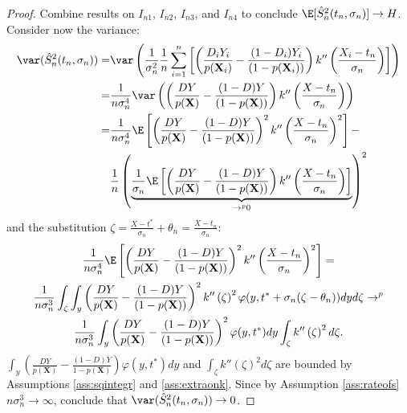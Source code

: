 {\begin{proof}
        Combine results on $I_{n1}$, $I_{n2}$, $I_{n3}$, and $I_{n4}$ to conclude $\E[\hat{S}^2_n(t_n,\sigma_n)] \rightarrow H$. Consider now the variance:
        \begin{align}
            \var(\hat{S}^2_n(t_n,\sigma_n)) =& \var\left( \frac{1}{\sigma_n^2} \frac{1}{n} \sum_{i=1}^n \left[\left(\frac{D_i Y_i}{p(\textbf{X}_i)} - \frac{(1-D_i) Y_i}{(1-p(\textbf{X}_i))} \right) k''\left(\frac{X_i - t_n}{\sigma_n} \right) \right] \right) \\
            =& \frac{1}{n \sigma_n^4} \var\left( \left(\frac{D Y}{p(\textbf{X})} - \frac{(1-D) Y}{(1-p(\textbf{X}))} \right) k''\left(\frac{X - t_n}{\sigma_n} \right) \right) \\
            =& \frac{1}{n \sigma_n^4} \E\left[ \left(\frac{D Y}{p(\textbf{X})} - \frac{(1-D) Y}{(1-p(\textbf{X}))} \right)^2 k''\left(\frac{X - t_n}{\sigma_n} \right)^2 \right] -\\
            & \frac{1}{n} \left(\underbrace{\frac{1}{\sigma_n}\E\left[ \left(\frac{D Y}{p(\textbf{X})} - \frac{(1-D) Y}{(1-p(\textbf{X}))} \right) k''\left(\frac{X - t_n}{\sigma_n} \right) \right]}_{\rightarrow^p 0} \right)^2
        \end{align}
        and the substitution $\zeta = \frac{X - t^*}{\sigma_n} + \theta_n = \frac{X - t_n}{\sigma_n}$:
        \begin{gather}
            \frac{1}{n \sigma_n^4} \E\left[ \left(\frac{D Y}{p(\textbf{X})} - \frac{(1-D) Y}{(1-p(\textbf{X}))} \right)^2 k''\left(\frac{X - t_n}{\sigma_n} \right)^2 \right] = \\
            \frac{1}{n \sigma_n^3} \int_\zeta \int_y \left(\frac{D Y}{p(\textbf{X})} - \frac{(1-D) Y}{(1-p(\textbf{X}))} \right)^2 k''\left(\zeta \right)^2 \varphi(y,t^* + \sigma_n(\zeta - \theta_n)) dy d\zeta \rightarrow^p \\
            \frac{1}{n \sigma_n^3} \int_y \left(\frac{D Y}{p(\textbf{X})} - \frac{(1-D) Y}{(1-p(\textbf{X}))} \right)^2 \varphi(y,t^*) dy \int_\zeta k''\left(\zeta \right)^2 d\zeta.
        \end{gather}
        $\int_y \left(\frac{D Y}{p(\textbf{X})} - \frac{(1-D) Y}{1-p(\textbf{X})} \right) \varphi(y,t^* ) dy$ and $\int_\zeta k''\left(\zeta \right)^2 d\zeta$ are bounded by Assumptions \ref{ass:sqintegr} and \ref{ass:extraonk}. Since by Assumption \ref{ass:rateofs} $n \sigma_n^3 \rightarrow \infty$, conclude that $\var(\hat{S}^2_n(t_n,\sigma_n)) \rightarrow 0$.
    \end{proof}

}
